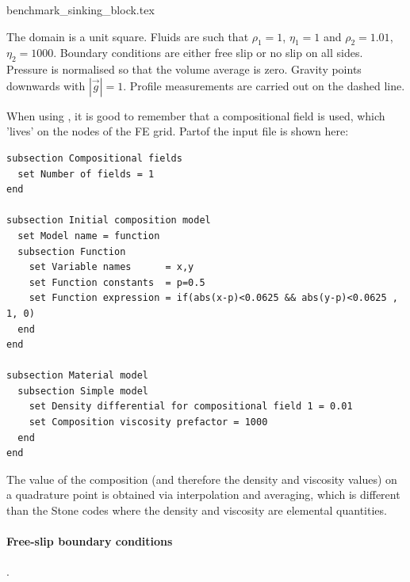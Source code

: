\begin{flushright} {\tiny {\color{gray} benchmark\_sinking\_block.tex}} \end{flushright}

The domain is a unit square. Fluids are such that 
$\rho_1=1$, $\eta_1=1$ and $\rho_2=1.01$, $\eta_2=1000$.
Boundary conditions are either free slip or no slip on all sides. 
Pressure is normalised so that the volume average is zero. 
Gravity points downwards with $|\vec{g}|=1$.
Profile measurements are carried out on the dashed line.


\begin{center}

\end{center}

When using \aspect{}, it is good to remember that a compositional field is used, 
which 'lives' on the nodes of the FE grid. Partof the input file is shown here: 

\begin{verbatim}
subsection Compositional fields
  set Number of fields = 1 
end 

subsection Initial composition model
  set Model name = function
  subsection Function
    set Variable names      = x,y 
    set Function constants  = p=0.5
    set Function expression = if(abs(x-p)<0.0625 && abs(y-p)<0.0625 , 1, 0)
  end 
end

subsection Material model
  subsection Simple model
    set Density differential for compositional field 1 = 0.01
    set Composition viscosity prefactor = 1000
  end 
end
\end{verbatim}

The value of the composition (and therefore 
the density and viscosity values) on a quadrature point is obtained via interpolation 
and averaging, which is different than the Stone codes where the density 
and viscosity are elemental quantities.

\newpage
\paragraph{Free-slip boundary conditions}.

